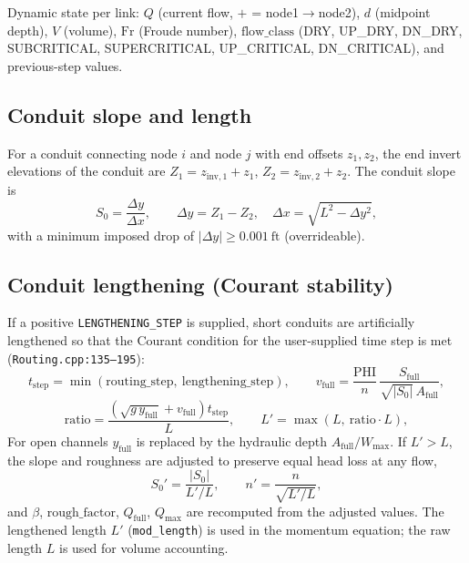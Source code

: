 \documentclass[11pt,a4paper]{article}
\newcommand{\ft}{\mathrm{ft}}
\begin{document}
Dynamic state per link: $Q$ (current flow, $+$ = node1$\to$node2), $d$
(midpoint depth), $V$ (volume), $\mathrm{Fr}$ (Froude number), $\mathrm{flow\_class}$
(DRY, UP\_DRY, DN\_DRY, SUBCRITICAL, SUPERCRITICAL, UP\_CRITICAL, DN\_CRITICAL),
and previous-step values.

\subsection{Conduit slope and length}

For a conduit connecting node $i$ and node $j$ with end offsets $z_1, z_2$,
the end invert elevations of the conduit are $Z_1 = z_{\mathrm{inv},1} +
z_1$, $Z_2 = z_{\mathrm{inv},2} + z_2$. The conduit slope is
\begin{equation}
  S_0 = \frac{\Delta y}{\Delta x},
  \qquad \Delta y = Z_1 - Z_2, \quad
  \Delta x = \sqrt{L^{2} - \Delta y^{2}},
\end{equation}
with a minimum imposed drop of $\lvert \Delta y \rvert \ge 0.001\ \ft$
(overrideable).

\subsection{Conduit lengthening (Courant stability)}

If a positive \texttt{LENGTHENING\_STEP} is supplied, short conduits are
artificially lengthened so that the Courant condition for the user-supplied
time step is met (\texttt{Routing.cpp:135--195}):
\begin{equation}
  t_{\mathrm{step}} = \min(\mathrm{routing\_step},\ \mathrm{lengthening\_step}),
  \qquad
  v_{\mathrm{full}} = \frac{\mathrm{PHI}}{n}\,\frac{S_{\mathrm{full}}}
    {\sqrt{|S_0|}\,A_{\mathrm{full}}},
\end{equation}
\begin{equation}
  \mathrm{ratio} = \frac{\left(\sqrt{g\,y_{\mathrm{full}}} + v_{\mathrm{full}}\right)
    t_{\mathrm{step}}}{L},
  \qquad
  L' = \max(L,\ \mathrm{ratio}\cdot L),
\end{equation}
For open channels $y_{\mathrm{full}}$ is replaced by the hydraulic depth
$A_{\mathrm{full}}/W_{\max}$. If $L' > L$, the slope and roughness are adjusted
to preserve equal head loss at any flow,
\begin{equation}
  S_0' = \frac{|S_0|}{L'/L}, \qquad
  n' = \frac{n}{\sqrt{L'/L}},
\end{equation}
and $\beta$, $\mathrm{rough\_factor}$, $Q_{\mathrm{full}}$, $Q_{\max}$ are
recomputed from the adjusted values. The lengthened length $L'$
(\texttt{mod\_length}) is used in the momentum equation; the raw length $L$ is
used for volume accounting.
\end{document}
